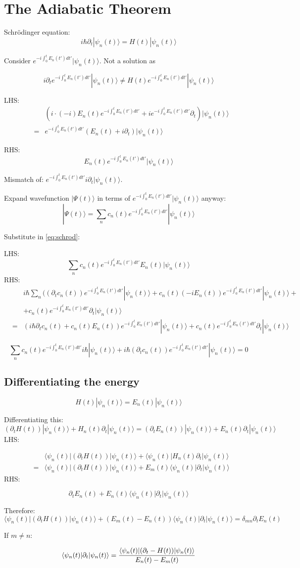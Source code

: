 \documentclass[12pt]{article}
\begin{document}
\newcommand{\dt}[0]{\partial_t}
\newcommand{\phase}[0]{e^{-i\int_0^tE_n(t')dt'}}
\newcommand{\wps}[0]{|\psi(t)\rangle}
\newcommand{\wpsn}[0]{|\psi_n(t)\rangle}
\newcommand{\awpsm}[0]{\langle\psi_n(t)|}
\newcommand{\wPs}[0]{|\Psi(t)\rangle}

\section{The Adiabatic Theorem}

Schr\"odinger equation:
\begin{equation}
\label{eq:schrod}
i\hbar\dt\wpsn=H(t)\wpsn
\end{equation}

Consider $\phase\wpsn$. Not a solution as

\[
i\dt\phase\wpsn \ne H(t)\phase\wpsn
\]

LHS:
\begin{eqnarray*}
& & (i\cdot(-i)E_n(t)\phase+i\phase\dt)\wpsn \\
& = & \phase(E_n(t)+i\dt)\wpsn
\end{eqnarray*}

RHS:
\[
E_n(t)\phase\wpsn
\]

Mismatch of: $\phase i\dt\wpsn$.

Expand wavefunction $\wPs$ in terms of $\phase\wpsn$ anyway:
\[
\wPs = \sum_nc_n(t)\phase\wpsn
\]

Substitute in \ref{eq:schrod}:

LHS:
\[
\sum_nc_n(t)\phase E_n(t)\wpsn
\]
RHS:
\begin{eqnarray*}
& & i\hbar\sum_n((\dt c_n(t))\phase\wpsn + c_n(t)(-iE_n(t))\phase\wpsn+ \\
& &                                      + c_n(t)\phase\dt\wpsn \\
&=& (i\hbar\dt c_n(t)+c_n(t)E_n(t))\phase\wpsn+c_n(t)\phase\dt\wpsn
\end{eqnarray*}

\[
\sum_nc_n(t)\phase i\hbar\wpsn+i\hbar(\dt c_n(t))\phase\wpsn = 0
\]

\subsection{Differentiating the energy}
\[
H(t)\wpsn=E_n(t)\wpsn
\]

Differentiating this:
\[
(\dt H(t))\wpsn+H_n(t)\dt\wpsn=(\dt E_n(t))\wpsn+E_n(t)\dt\wpsn
\]
LHS:

\begin{eqnarray*}
& & \awpsm(\dt H(t))\wpsn+\awpsm H_n(t)\dt\wpsn \\
&=& \awpsm(\dt H(t))\wpsn+E_m(t)\awpsm\dt\wpsn
\end{eqnarray*}
RHS:

\[
\dt E_n(t)+E_n(t)\awpsm\dt\wpsn
\]

Therefore:
\[
\awpsm(\dt H(t))\wpsn+(E_m(t)-E_n(t))\awpsm\dt\wpsn=\delta_{mn}\dt E_n(t)
\]

If $m\ne n$:

\[
\awpsm\dt\wpsn={\awpsm(\dt -H(t))\wpsn \over E_n(t)-E_m(t)}
\]

\end{document}
